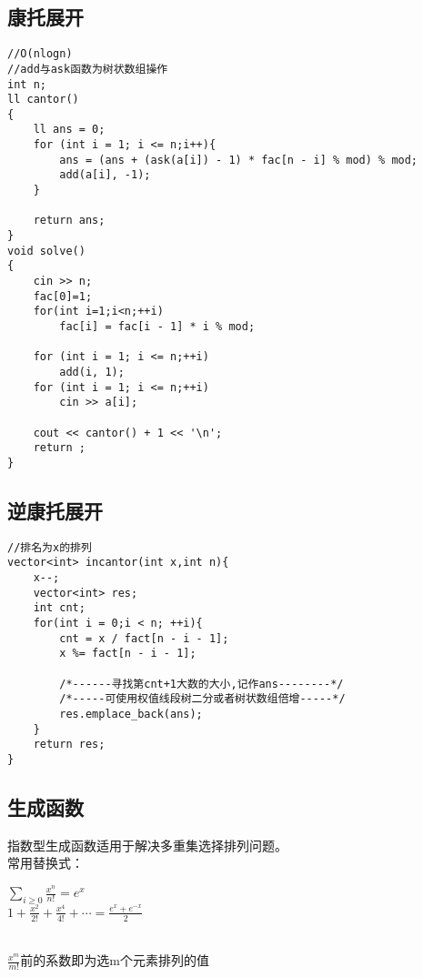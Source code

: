 \documentclass[twocolumn,a4]{article}
\begin{document}
\subsection{康托展开}
\begin{lstlisting}
//O(nlogn)
//add与ask函数为树状数组操作
int n;
ll cantor()
{
    ll ans = 0;
    for (int i = 1; i <= n;i++){
        ans = (ans + (ask(a[i]) - 1) * fac[n - i] % mod) % mod;
        add(a[i], -1);
    }

    return ans;
}
void solve()
{
    cin >> n;
    fac[0]=1;
    for(int i=1;i<n;++i)
        fac[i] = fac[i - 1] * i % mod;

    for (int i = 1; i <= n;++i)
        add(i, 1);
    for (int i = 1; i <= n;++i)
        cin >> a[i];
        
    cout << cantor() + 1 << '\n';
    return ;
}

\end{lstlisting}

\subsection{逆康托展开}
\begin{lstlisting}
//排名为x的排列
vector<int> incantor(int x,int n){
    x--;
    vector<int> res; 
    int cnt;
    for(int i = 0;i < n; ++i){
        cnt = x / fact[n - i - 1]; 
        x %= fact[n - i - 1];
        
        /*------寻找第cnt+1大数的大小,记作ans--------*/
        /*-----可使用权值线段树二分或者树状数组倍增-----*/
        res.emplace_back(ans);
    }
    return res;
}

\end{lstlisting}
\subsection{生成函数}
指数型生成函数适用于解决多重集选择排列问题。\\
常用替换式：\\
\begin{LARGE}
    $\sum_{i\geq 0} \frac{x^{n}}{n!}=e^{x}$\\
    $1+\frac{x^{2}}{2!}+\frac{x^{4}}{4!}+\cdots =\frac{e^{x}+e^{-x}}{2}$\\
\end{LARGE}
\\
$\frac{x^{m}}{m!}$前的系数即为选m个元素排列的值
\end{document}
